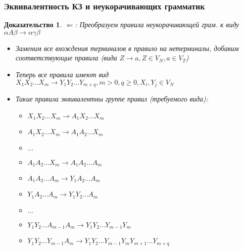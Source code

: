 \documentclass{beamer}
\newtheorem{ruproof}{Доказательство}
\begin{document}
\begin{frame}[fragile]
  \transwipe[direction=90]
  \frametitle{Эквивалентность КЗ и неукорачивающих грамматик}

\begin{ruproof}
$\Leftarrow$: Преобразуем правила неукорачивающей грам. к виду $\alpha A \beta \rightarrow \alpha \gamma \beta$

\begin{itemize}
  \item Заменим все вхождения терминалов в правило на нетерминалы, добавим соответствующие правила (вида $Z \rightarrow a, Z \in V_N, a \in V_T$)
  \item Теперь все правила имеют вид $X_1 X_2 \dots X_m \rightarrow Y_1 Y_2 \dots Y_{m+q}, m > 0, q \geq 0, X_i, Y_j \in V_N$
  \item Такие правила эквивалентны группе правил (требуемого вида):
  \begin{itemize}
    \item $X_1 X_2 \dots X_m \rightarrow A_1 X_2 \dots X_m$
    \item $A_1 X_2 \dots X_m \rightarrow A_1 A_2 \dots X_m$
    \item $\dots$
    \item $A_1 A_2 \dots X_m \rightarrow A_1 A_2 \dots A_m$
    \item $A_1 A_2 \dots A_m \rightarrow Y_1 A_2 \dots A_m$
    \item $Y_1 A_2 \dots A_m \rightarrow Y_1 Y_2 \dots A_m$
    \item $\dots$
    \item $Y_1 Y_2 \dots A_{m - 1} A_m \rightarrow Y_1 Y_2 \dots Y_{m-1} Y_m$
    \item $Y_1 Y_2 \dots Y_{m - 1} A_m \rightarrow Y_1 Y_2 \dots Y_{m-1} Y_m Y_{m+1} \dots Y_{m+q}$
  \end{itemize}
\end{itemize}
\end{ruproof}

\end{frame}
\end{document}
